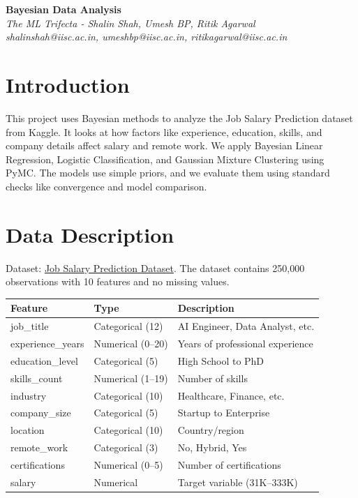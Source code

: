 \documentclass[11pt,a4paper]{article}
\begin{document}
\begin{center}
    \LARGE\textbf{Bayesian Data Analysis}\vspace{0.5em}\\
    \large\textit{The ML Trifecta - Shalin Shah, Umesh BP, Ritik Agarwal} \\
    \large\textit{shalinshah@iisc.ac.in, umeshbp@iisc.ac.in, ritikagarwal@iisc.ac.in}
\end{center}
\vspace{1em}

\section{Introduction}
This project uses Bayesian methods to analyze the Job Salary Prediction dataset from Kaggle. It looks at how factors like experience, education, skills, and company details affect salary and remote work. We apply Bayesian Linear Regression, Logistic Classification, and Gaussian Mixture Clustering using PyMC. The models use simple priors, and we evaluate them using standard checks like convergence and model comparison.

\section{Data Description}
Dataset: \href{https://www.kaggle.com/datasets/nalisha/job-salary-prediction-dataset/data}{Job Salary Prediction Dataset}. The dataset contains 250,000 observations with 10 features and no missing values.

\begin{table}[htbp]
\centering
\begin{tabular}{lll}
\hline
\textbf{Feature} & \textbf{Type} & \textbf{Description} \\
\hline
job\_title & Categorical (12) & AI Engineer, Data Analyst, etc. \\
experience\_years & Numerical (0--20) & Years of professional experience \\
education\_level & Categorical (5) & High School to PhD \\
skills\_count & Numerical (1--19) & Number of skills \\
industry & Categorical (10) & Healthcare, Finance, etc. \\
company\_size & Categorical (5) & Startup to Enterprise \\
location & Categorical (10) & Country/region \\
remote\_work & Categorical (3) & No, Hybrid, Yes \\
certifications & Numerical (0--5) & Number of certifications \\
salary & Numerical & Target variable (31K--333K) \\
\hline
\end{tabular}
\end{table}
\end{document}
